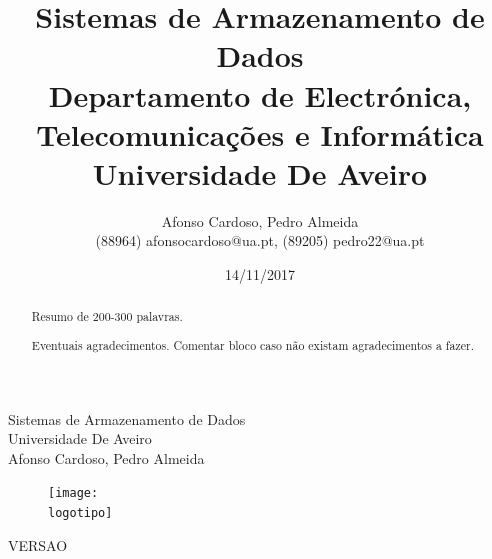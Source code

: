 \documentclass{report}
\begin{document}
%
\def\titulo{Sistemas de Armazenamento de Dados}
\def\data{14/11/2017}
\def\autores{Afonso Cardoso, Pedro Almeida}
\def\autorescontactos{(88964) afonsocardoso@ua.pt, (89205) pedro22@ua.pt}
\def\versao{VERSAO}
\def\departamento{Departamento de Electrónica, Telecomunicações e Informática}
\def\empresa{Universidade De Aveiro}
\def\logotipo{ua.pdf}
%

%
\begin{titlepage}

\begin{center}
%
\vspace*{50mm}
%
{\Huge \titulo}\\ 
%
\vspace{10mm}
%
{\Large \empresa}\\
%
\vspace{10mm}
%
{\LARGE \autores}\\ 
%
\vspace{30mm}
%
\begin{figure}[h]
\center
\texttt{[image: \\logotipo]}
\end{figure}
%
\vspace{30mm}
\end{center}
%
\begin{flushright}
\versao
\end{flushright}
\end{titlepage}

\title{%
{\Huge\textbf{\titulo}}\\
{\Large \departamento\\ \empresa}
}
%
\author{%
    \autores \\
    \autorescontactos
}
%
\date{\data}
%
\maketitle


\begin{abstract}
Resumo de 200-300 palavras.
\end{abstract}

\renewcommand{\abstractname}{Agradecimentos}
\begin{abstract}
Eventuais agradecimentos.
Comentar bloco caso não existam agradecimentos a fazer.
\end{abstract}
\end{document}
